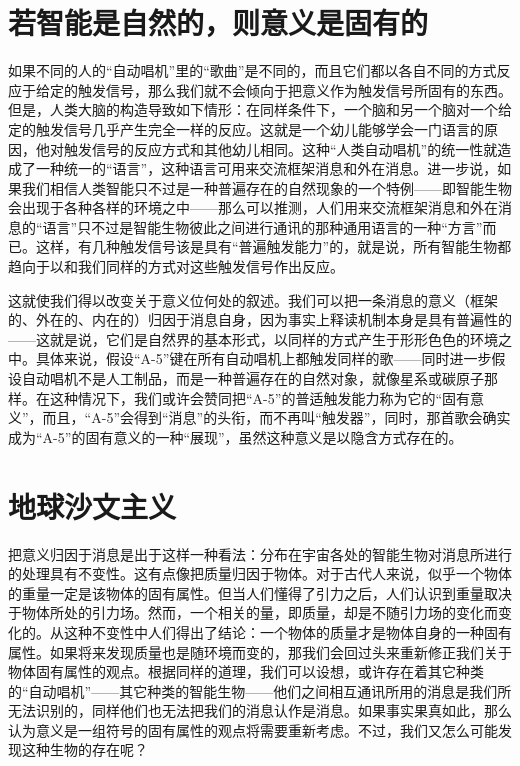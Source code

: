 \section{若智能是自然的，则意义是固有的}

如果不同的人的“自动唱机”里的“歌曲”是不同的，而且它们都以各自不同的方式反应于给定的触发信号，那么我们就不会倾向于把意义作为触发信号所固有的东西。但是，人类大脑的构造导致如下情形：在同样条件下，一个脑和另一个脑对一个给定的触发信号几乎产生完全一样的反应。这就是一个幼儿能够学会一门语言的原因，他对触发信号的反应方式和其他幼儿相同。这种“人类自动唱机”的统一性就造成了一种统一的“语言”，这种语言可用来交流框架消息和外在消息。进一步说，如果我们相信人类智能只不过是一种普遍存在的自然现象的一个特例——即智能生物会出现于各种各样的环境之中——那么可以推测，人们用来交流框架消息和外在消息的“语言”只不过是智能生物彼此之间进行通讯的那种通用语言的一种“方言”而已。这样，有几种触发信号该是具有“普遍触发能力”的，就是说，所有智能生物都趋向于以和我们同样的方式对这些触发信号作出反应。

这就使我们得以改变关于意义位何处的叙述。我们可以把一条消息的意义（框架的、外在的、内在的）归因于消息自身，因为事实上释读机制本身是具有普遍性的——这就是说，它们是自然界的基本形式，以同样的方式产生于形形色色的环境之中。具体来说，假设“A-5”键在所有自动唱机上都触发同样的歌——同时进一步假设自动唱机不是人工制品，而是一种普遍存在的自然对象，就像星系或碳原子那样。在这种情况下，我们或许会赞同把“A-5”的普适触发能力称为它的“固有意义”，而且，“A-5”会得到“消息”的头衔，而不再叫“触发器”，同时，那首歌会确实成为“A-5”的固有意义的一种“展现”，虽然这种意义是以隐含方式存在的。

\section{地球沙文主义}

把意义归因于消息是出于这样一种看法：分布在宇宙各处的智能生物对消息所进行的处理具有不变性。这有点像把质量归因于物体。对于古代人来说，似乎一个物体的重量一定是该物体的固有属性。但当人们懂得了引力之后，人们认识到重量取决于物体所处的引力场。然而，一个相关的量，即质量，却是不随引力场的变化而变化的。从这种不变性中人们得出了结论：一个物体的质量才是物体自身的一种固有属性。如果将来发现质量也是随环境而变的，那我们会回过头来重新修正我们关于物体固有属性的观点。根据同样的道理，我们可以设想，或许存在着其它种类的“自动唱机”——其它种类的智能生物——他们之间相互通讯所用的消息是我们所无法识别的，同样他们也无法把我们的消息认作是消息。如果事实果真如此，那么认为意义是一组符号的固有属性的观点将需要重新考虑。不过，我们又怎么可能发现这种生物的存在呢？

